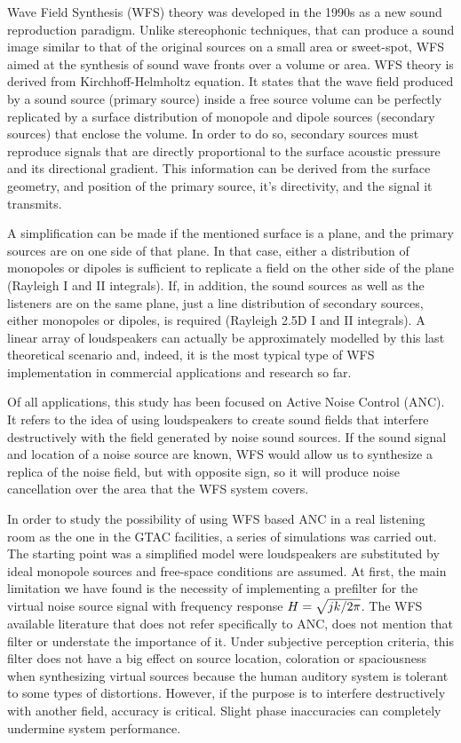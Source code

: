 Wave Field Synthesis (WFS) theory was developed in the 1990s as a new sound reproduction paradigm. Unlike stereophonic techniques, that can produce a sound image similar to that of the original sources on a small area or sweet-spot, WFS aimed at the synthesis of sound wave fronts over a volume or area. WFS theory is derived from Kirchhoff-Helmholtz equation. It states that the wave field produced by a sound source (primary source) inside a free source volume can be perfectly replicated by a surface distribution of monopole and dipole sources (secondary sources) that enclose the volume. In order to do so, secondary sources must reproduce signals that are directly proportional to the surface acoustic pressure and its directional gradient. This information can be derived from the surface geometry, and position of the primary source, it's directivity, and the signal it transmits.

A simplification can be made if the mentioned surface is a plane, and the primary sources are on one side of that plane. In that case, either a distribution of monopoles or dipoles is sufficient to replicate a field on the other side of the plane (Rayleigh I and II integrals). If, in addition, the sound sources as well as the listeners are on the same plane, just a line distribution of secondary sources, either monopoles or dipoles, is required (Rayleigh 2.5D I and II integrals). A linear array of loudspeakers can actually be approximately modelled by this last theoretical scenario and, indeed, it is the most typical type of WFS implementation in commercial applications and research so far.

Of all applications, this study has been focused on Active Noise Control (ANC). It refers to the idea of using loudspeakers to create sound fields that interfere destructively with the field generated by noise sound sources. If the sound signal and location of a noise source are known, WFS would allow us to synthesize a replica of the noise field, but with opposite sign, so it will produce noise cancellation over the area that the WFS system covers.

In order to study the possibility of using WFS based ANC in a real listening room as the one in the GTAC facilities, a series of simulations was carried out. The starting point was a simplified model were loudspeakers are substituted by ideal monopole sources and free-space conditions are assumed. At first, the main limitation we have found is the necessity of implementing a prefilter for the virtual noise source signal with frequency response $\freqFilter[frequency] = \sqrt{jk/2\pi}$. The WFS available literature that does not refer specifically to ANC, does not mention that filter or understate the importance of it. Under subjective perception criteria, this filter does not have a big effect on source location, coloration or spaciousness when synthesizing virtual sources because the human auditory system is tolerant to some types of distortions. However, if the purpose is to interfere destructively with another field, accuracy is critical. Slight phase inaccuracies can completely undermine system performance.

